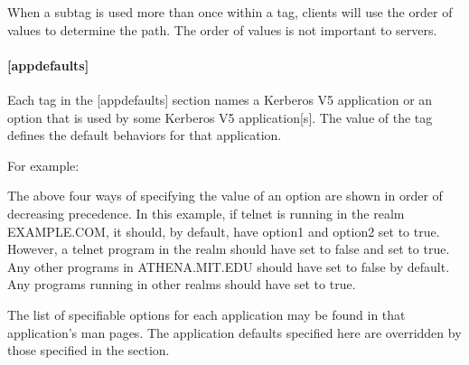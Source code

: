 \documentclass[letterpaper,10pt,english]{sphinxmanual}
\begin{document}
When a subtag is used more than once within a tag, clients will use
the order of values to determine the path.  The order of values is not
important to servers.


\paragraph{{[}appdefaults{]}}
\label{\detokenize{admin/conf_files/krb5_conf:id5}}\label{\detokenize{admin/conf_files/krb5_conf:appdefaults}}
Each tag in the {[}appdefaults{]} section names a Kerberos V5 application
or an option that is used by some Kerberos V5 application{[}s{]}.  The
value of the tag defines the default behaviors for that application.

For example:

%
\begin{sphinxVerbatim}[commandchars=\\\{\}]
\PYG{p}{[}\PYG{p}{]}
      
          
              
      
          
          
      
          
      
\end{sphinxVerbatim}

The above four ways of specifying the value of an option are shown in
order of decreasing precedence. In this example, if telnet is running
in the realm EXAMPLE.COM, it should, by default, have option1 and
option2 set to true.  However, a telnet program in the realm
 should have  set to false and
 set to true.  Any other programs in ATHENA.MIT.EDU should
have  set to false by default.  Any programs running in
other realms should have  set to true.

The list of specifiable options for each application may be found in
that application’s man pages.  The application defaults specified here
are overridden by those specified in the {\hyperref[\detokenize{admin/conf_files/krb5_conf:realms}]{}} section.
\end{document}
